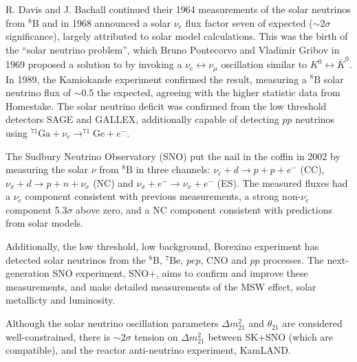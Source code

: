 R. Davis and J. Bachall continued their 1964 measurements\cite{davis} of the solar neutrinos from $^{8}\text{B}$ and in 1968\cite{davis_sun} announced a solar $\nu_e$ flux factor seven of expected ($\sim2\sigma$ significance), largely attributed to solar model calculations. This was the birth of the ``solar neutrino problem'', which Bruno Pontecorvo and Vladimir Gribov in 1969\cite{pontecorvo_gribov} proposed a solution to by invoking a $\nu_e\leftrightarrow\nu_\mu$ oscillation similar to $K^0 \leftrightarrow\bar{K}^0$. In 1989, the Kamiokande experiment\cite{kamiokande_solar} confirmed the result, measuring a $^{8}\text{B}$ solar neutrino flux of $\sim0.5$ the expected, agreeing with the higher statistic data from Homestake\cite{davis_sun2}. The solar neutrino deficit was confirmed from the low threshold detectors SAGE\cite{sage_solar} and GALLEX\cite{gallex_solar}, additionally capable of detecting $p p$ neutrinos using $^{71}\text{Ga}+\nu_e \rightarrow ^{71}\text{Ge}+e^-$.

The Sudbury Neutrino Observatory (SNO) put the nail in the coffin in 2002\cite{sno_solar} by measuring the solar $\nu$ from $^{8}\text{B}$ in three channels: $\nu_e + d \rightarrow p+p+e^-$ (CC), $\nu_x + d\rightarrow p+ n + \nu_x$ (NC) and $\nu_x + e^- \rightarrow \nu_x+e^-$ (ES). The measured fluxes had a $\nu_e$ component consistent with previous measurements, a strong non-$\nu_e$ component 5.3$\sigma$ above zero, and a NC component consistent with predictions from solar models.

Additionally, the low threshold, low background, Borexino experiment has detected solar neutrinos from the $^{8}\text{B}$, $^{7}\text{Be}$, $pep$, CNO and $pp$ processes\cite{borexino_summary}. The next-generation SNO experiment, SNO+, aims to confirm and improve these measurements, and make detailed measurements of the MSW effect, solar metallicty and luminosity.

Although the solar neutrino oscillation parameters $\Delta m^2_{21}$ and $\theta_{21}$ are considered well-constrained, there is $\sim 2\sigma$ tension on $\Delta m^2_{21}$ between SK+SNO (which are compatible), and the reactor anti-neutrino experiment, KamLAND\cite{m2_tension}.

